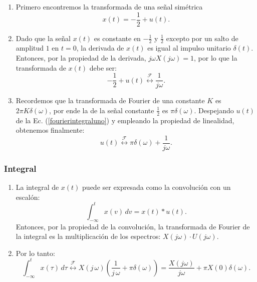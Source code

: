 \documentclass[11pt,a4paper,openany]{book}
\begin{document}
\begin{enumerate}
	
	\item Primero encontremos la transformada de una señal simétrica 
	\begin{equation}
		x(t) = -\frac{1}{2} + u(t).
	\end{equation}
	
	\item Dado que la señal $x(t)$ es constante en $-\frac{1}{2}$ y $\frac{1}{2}$ excepto por un salto de amplitud $1$ en $t=0$, la derivada de $x(t)$ es igual al impulso unitario $\delta(t)$.
	Entonces, por la propiedad de la derivada, $j\omega X(j\omega) = 1$, por lo que la transformada de $x(t)$ debe ser:
	\begin{equation}
		-\frac{1}{2} + u(t) \stackrel{\mathcal{F}}{\longleftrightarrow} \frac{1}{j \omega}. \label{fourierintegraluno}
	\end{equation}
	
	\item Recordemos que la transformada de Fourier de una constante $K$ es $2\pi K \delta(\omega)$, por ende la de la señal constante $\frac{1}{2}$ es $\pi \delta(\omega)$. Despejando $u(t)$ de la Ec. (\ref{fourierintegraluno}) y empleando la propiedad de linealidad, obtenemos finalmente:
	\begin{equation}
		u(t) \stackrel{\mathcal{F}}{\longleftrightarrow} \pi \delta(\omega) + \frac{1}{j \omega}.
	\end{equation}
	
\end{enumerate}

\subsubsection{Integral}

\begin{enumerate}
	
	\item La integral de $x(t)$ puede ser expresada como la convolución con un escalón:
	\begin{equation}
		\int_{-\infty}^{t} x(v) \, dv = x(t) * u(t).
	\end{equation}
	Entonces, por la propiedad de la convolución, la transformada de Fourier de la integral es la multiplicación de los espectros: $X(j\omega) \cdot U(j\omega)$.
	\item Por lo tanto:
	\begin{equation}
		\int_{-\infty}^{t} x(\tau) \, d\tau \stackrel{\mathcal{F}}{\longleftrightarrow} X(j \, \omega) \left( \frac{1}{j \, \omega} + \pi \delta(\omega) \right) = \frac{X(j\omega)}{j \omega} + \pi X(0) \delta(\omega).
	\end{equation}
\end{enumerate}
\end{document}
